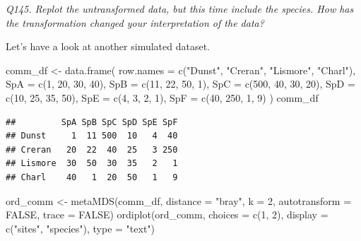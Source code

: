 \documentclass[
  11pt,
  a4paper,
]{book}
\newenvironment{Shaded}{\begin{snugshade}}{\end{snugshade}}
\newcommand{\AttributeTok}[1]{\textcolor[rgb]{0.77,0.63,0.00}{#1}}
\newcommand{\ConstantTok}[1]{\textcolor[rgb]{0.00,0.00,0.00}{#1}}
\newcommand{\DecValTok}[1]{\textcolor[rgb]{0.00,0.00,0.81}{#1}}
\newcommand{\FunctionTok}[1]{\textcolor[rgb]{0.00,0.00,0.00}{#1}}
\newcommand{\NormalTok}[1]{#1}
\newcommand{\OtherTok}[1]{\textcolor[rgb]{0.56,0.35,0.01}{#1}}
\newcommand{\StringTok}[1]{\textcolor[rgb]{0.31,0.60,0.02}{#1}}
\begin{document}
\emph{Q145. Replot the untransformed data, but this time include the species. How has the transformation changed your interpretation of the data?}

Let's have a look at another simulated dataset.

\begin{Shaded}
\begin{Highlighting}[]
\NormalTok{comm\_df }\OtherTok{\textless{}{-}} \FunctionTok{data.frame}\NormalTok{(}
  \AttributeTok{row.names =} \FunctionTok{c}\NormalTok{(}\StringTok{"Dunst"}\NormalTok{, }\StringTok{"Creran"}\NormalTok{, }\StringTok{"Lismore"}\NormalTok{, }\StringTok{"Charl"}\NormalTok{),}
  \AttributeTok{SpA =} \FunctionTok{c}\NormalTok{(}\DecValTok{1}\NormalTok{, }\DecValTok{20}\NormalTok{, }\DecValTok{30}\NormalTok{, }\DecValTok{40}\NormalTok{),}
  \AttributeTok{SpB =} \FunctionTok{c}\NormalTok{(}\DecValTok{11}\NormalTok{, }\DecValTok{22}\NormalTok{, }\DecValTok{50}\NormalTok{, }\DecValTok{1}\NormalTok{),}
  \AttributeTok{SpC =} \FunctionTok{c}\NormalTok{(}\DecValTok{500}\NormalTok{, }\DecValTok{40}\NormalTok{, }\DecValTok{30}\NormalTok{, }\DecValTok{20}\NormalTok{),}
  \AttributeTok{SpD =} \FunctionTok{c}\NormalTok{(}\DecValTok{10}\NormalTok{, }\DecValTok{25}\NormalTok{, }\DecValTok{35}\NormalTok{, }\DecValTok{50}\NormalTok{),}
  \AttributeTok{SpE =} \FunctionTok{c}\NormalTok{(}\DecValTok{4}\NormalTok{, }\DecValTok{3}\NormalTok{, }\DecValTok{2}\NormalTok{, }\DecValTok{1}\NormalTok{),}
  \AttributeTok{SpF =} \FunctionTok{c}\NormalTok{(}\DecValTok{40}\NormalTok{, }\DecValTok{250}\NormalTok{, }\DecValTok{1}\NormalTok{, }\DecValTok{9}\NormalTok{)}
\NormalTok{)}
\NormalTok{comm\_df}
\end{Highlighting}
\end{Shaded}

\begin{verbatim}
##         SpA SpB SpC SpD SpE SpF
## Dunst     1  11 500  10   4  40
## Creran   20  22  40  25   3 250
## Lismore  30  50  30  35   2   1
## Charl    40   1  20  50   1   9
\end{verbatim}

\begin{Shaded}
\begin{Highlighting}[]
\NormalTok{ord\_comm }\OtherTok{\textless{}{-}} \FunctionTok{metaMDS}\NormalTok{(comm\_df, }\AttributeTok{distance =} \StringTok{"bray"}\NormalTok{, }\AttributeTok{k =} \DecValTok{2}\NormalTok{, }
                    \AttributeTok{autotransform =} \ConstantTok{FALSE}\NormalTok{, }\AttributeTok{trace =} \ConstantTok{FALSE}\NormalTok{)}
\FunctionTok{ordiplot}\NormalTok{(ord\_comm, }\AttributeTok{choices =} \FunctionTok{c}\NormalTok{(}\DecValTok{1}\NormalTok{, }\DecValTok{2}\NormalTok{), }
         \AttributeTok{display =} \FunctionTok{c}\NormalTok{(}\StringTok{"sites"}\NormalTok{, }\StringTok{"species"}\NormalTok{), }\AttributeTok{type =} \StringTok{"text"}\NormalTok{)}
\end{Highlighting}
\end{Shaded}
\end{document}
